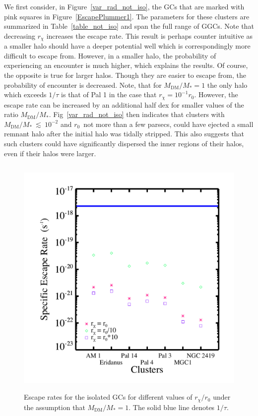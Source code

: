 \documentclass[aps,floatfix,prd,showpacs]{revtex4}
\newcommand{\rx}{r_\chi}
\newcommand{\MDM}{M_{\mathrm{DM}}}
\begin{document}
We first consider, in Figure~\ref{var_rad_not_iso}, the GCs that are marked with pink squares in Figure~\ref{EscapePlummer1}. The parameters for these clusters are summarized in Table~\ref{table_not_iso} and span the full range of GGCs. Note that decreasing $\rx$ increases the escape rate. This result is perhaps counter intuitive as a smaller halo should have a deeper potential well which is correspondingly more difficult to escape from. However, in a smaller halo, the probability of experiencing an encounter is much higher, which explains the results. Of course, the opposite is true for larger halos. Though they are easier to escape from, the probability of encounter is decreased. Note, that for $\MDM/M_* = 1$ the only halo which exceeds $1/\tau$ is that of Pal 1 in the case that $\rx = 10^{-1}r_0$. However, the escape rate can be increased by an additional half dex for smaller values of the ratio $\MDM/M_*$. Fig~\ref{var_rad_not_iso} then indicates that clusters with $\MDM/M_*~\lesssim~10^{-2}$ and $r_0$~not more than a few parsecs, could have ejected a small remnant halo after the initial halo was tidally stripped.  This also suggests that such clusters could have significantly dispersed the inner regions of their halos, even if their halos were larger.
%
\begin{figure}[htp]
\centering
\includegraphics[width=12cm, height=12cm]{var_rad_iso}
\caption{Escape rates for the isolated GCs for different values of $\rx/r_0$ under the assumption that $\MDM/M_* = 1$. The solid blue line denotes $1/\tau$.}
\label{var_rad_iso}
\end{figure}
\end{document}
